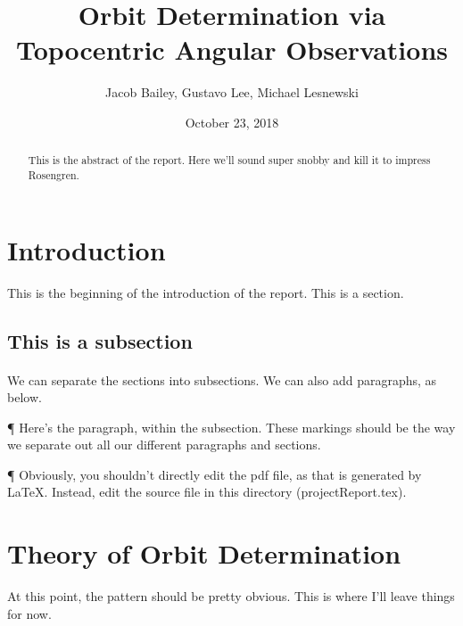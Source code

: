 \documentclass[11pt,twoside,letterpaper]{article}
\begin{document}
\title{Orbit Determination via Topocentric Angular Observations}
\author{Jacob Bailey, Gustavo Lee, Michael Lesnewski}
\date{October 23, 2018}
\maketitle

  \begin{abstract}
    This is the abstract of the report. Here we'll sound super snobby
    and kill it to impress Rosengren.
  \end{abstract}

  \section {Introduction} This is the beginning of the introduction of
    the report. This is a section.
    \subsection {This is a subsection}
    
    \paragraph{}We can separate the sections into subsections. We can
    also add paragraphs, as below.
    
    ¶ Here's the paragraph, within the subsection. These markings
    should be the way we separate out all our different paragraphs and
    sections.

    ¶ Obviously, you shouldn't directly edit the pdf file, as that is
    generated by LaTeX. Instead, edit the source file in this
    directory (projectReport.tex). 


    \section{Theory of Orbit Determination}
    At this point, the pattern should be pretty obvious. This is where
    I'll leave things for now.
  
\end{document}
